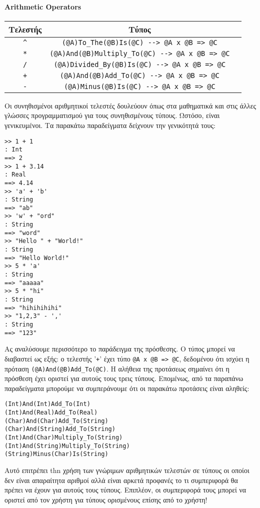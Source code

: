 \documentclass[diploma]{softlab-thesis}
\begin{document}
\paragraph{Arithmetic Operators}
\begin{center}
\begin{tabular}{ |c|c|c| }
\hline
Τελεστής & Τύπος
\\
\hline
\hline
\verb|^| & \verb|(@A)To_The(@B)Is(@C) --> @A x @B => @C|
\\
\hline
\verb|*| & \verb|(@A)And(@B)Multiply_To(@C) --> @A x @B => @C|
\\
\hline
\verb|/| & \verb|(@A)Divided_By(@B)Is(@C) --> @A x @B => @C|
\\
\hline
\verb|+| & \verb|(@A)And(@B)Add_To(@C) --> @A x @B => @C|
\\
\hline
\verb|-| & \verb|(@A)Minus(@B)Is(@C) --> @A x @B => @C|
\\
\hline
\end{tabular}
\end{center}
Οι συνηθισμένοι αριθμητικοί τελεστές δουλεύουν όπως στα μαθηματικά και στις
άλλες γλώσσες προγραμματισμού για τους συνηθισμένους τύπους. Ωστόσο, είναι
γενικευμένοι. Τα παρακάτω παραδείγματα δείχνουν την γενικότητά τους:
\begin{verbatim}
>> 1 + 1
: Int
==> 2
>> 1 + 3.14
: Real
==> 4.14
>> 'a' + 'b'
: String
==> "ab"
>> 'w' + "ord"
: String
==> "word"
>> "Hello " + "World!"
: String
==> "Hello World!"
>> 5 * 'a'
: String
==> "aaaaa"
>> 5 * "hi"
: String
==> "hihihihihi"
>> "1,2,3" - ','
: String
==> "123"
\end{verbatim}
Ας αναλύσουμε περισσότερο το παράδειγμα της πρόσθεσης.  Ο τύπος μπορεί να
διαβαστεί ως εξής: ο τελεστής '\verb|+|' έχει τύπο \verb|@A x @B => @C|,
δεδομένου ότι ισχύει η πρόταση \verb|(@A)And(@B)Add_To(@C)|.
Η αλήθεια της προτάσεως σημαίνει ότι η πρόσθεση έχει οριστεί για αυτούς τους
τρεις τύπους.
Επομένως, από τα παραπάνω παραδείγματα μπορούμε να συμπεράνουμε ότι οι
παρακάτω προτάσεις είναι αληθείς:
\begin{verbatim}
(Int)And(Int)Add_To(Int)
(Int)And(Real)Add_To(Real)
(Char)And(Char)Add_To(String)
(Char)And(String)Add_To(String)
(Int)And(Char)Multiply_To(String)
(Int)And(String)Multiply_To(String)
(String)Minus(Char)Is(String)
\end{verbatim}
Αυτό επιτρέπει thn χρήση των γνώριμων αριθμητικών τελεστών σε τύπους οι
οποίοι δεν είναι απαραίτητα αριθμοί αλλά είναι αρκετά προφανές το τι
συμπεριφορά θα πρέπει να έχουν για αυτούς τους τύπους. Επιπλέον, οι συμπεριφορά
τους μπορεί να οριστεί από τον χρήστη για τύπους ορισμένους επίσης από το
χρήστη!
\end{document}
